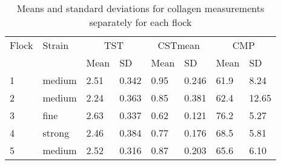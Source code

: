 %

\begin{table}[htp]
\centering
\caption{Means and standard deviations for collagen measurements separately for each flock}
\label{tab:collmeans}
\vspace{0.1in}
\begin{tabular}{|p{0.4in}|p{0.5in}|p{0.5in}|p{0.5in}|p{0.5in}|p{0.5in}|p{0.5in}|p{0.5in}|}  \hline
 Flock & Strain & \multicolumn{2}{c|}{TST} & \multicolumn{2}{c|}{CSTmean} & \multicolumn{2}{c|}{CMP} \\ \cline{3-8}
   &      & Mean & SD & Mean & SD & Mean & SD \\ \hline
 1 & medium & 2.51 & 0.342 & 0.95 & 0.246 & 61.9 & 8.24 \\
 2 & medium & 2.24 & 0.363 & 0.85 & 0.381 & 62.4 & 12.65 \\
 3 & fine   & 2.63 & 0.337 & 0.62 & 0.121 & 76.2 & 5.27 \\
 4 & strong & 2.46 & 0.384 & 0.77 & 0.176 & 68.5 & 5.81 \\
 5 & medium & 2.52 & 0.316 & 0.87 & 0.203 & 65.6 & 6.10 \\ \hline
\end{tabular}
\end{table}


%
